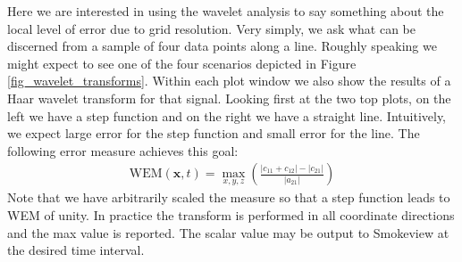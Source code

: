 \documentclass[11pt]{book}
\begin{document}
Here we are interested in using the wavelet analysis to say something about the local level of error due to grid resolution.  Very simply, we ask what can be discerned from a sample of four data points along a line.  Roughly speaking we might expect to see one of the four scenarios depicted in Figure \ref{fig_wavelet_transforms}.  Within each plot window we also show the results of a Haar wavelet transform for that signal.  Looking first at the two top plots, on the left we have a step function and on the right we have a straight line.  Intuitively, we expect large error for the step function and small error for the line.  The following error measure achieves this goal:
\begin{eqnarray}
\mbox{WEM}(\mathbf{x},t) = \max_{x,y,z}\left( \frac{|c_{11} + c_{12}| - |c_{21}|}{|a_{21}|} \right)
\end{eqnarray}
Note that we have arbitrarily scaled the measure so that a step function leads to WEM of unity.  In practice the transform is performed in all coordinate directions and the max value is reported.  The scalar value may be output to Smokeview at the desired time interval.
\end{document}
